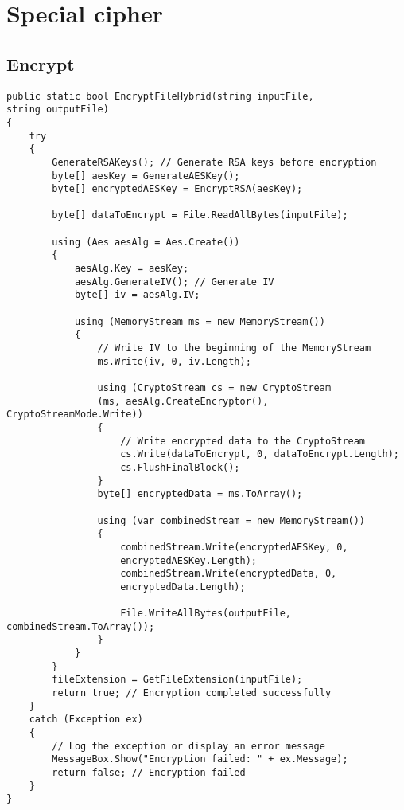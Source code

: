 \documentclass[a4paper,oneside,11pt]{book}
\begin{document}
\chapter[Special cipher]{Special cipher}
\section{Encrypt}
\begin{lstlisting}[language=Csh, caption={Endpoint to delete FITS file}]
public static bool EncryptFileHybrid(string inputFile, 
string outputFile)
{
    try
    {
        GenerateRSAKeys(); // Generate RSA keys before encryption
        byte[] aesKey = GenerateAESKey();
        byte[] encryptedAESKey = EncryptRSA(aesKey);
    
        byte[] dataToEncrypt = File.ReadAllBytes(inputFile);
    
        using (Aes aesAlg = Aes.Create())
        {
            aesAlg.Key = aesKey;
            aesAlg.GenerateIV(); // Generate IV
            byte[] iv = aesAlg.IV;
    
            using (MemoryStream ms = new MemoryStream())
            {
                // Write IV to the beginning of the MemoryStream
                ms.Write(iv, 0, iv.Length);
    
                using (CryptoStream cs = new CryptoStream
                (ms, aesAlg.CreateEncryptor(), CryptoStreamMode.Write))
                {
                    // Write encrypted data to the CryptoStream
                    cs.Write(dataToEncrypt, 0, dataToEncrypt.Length);
                    cs.FlushFinalBlock();
                }
                byte[] encryptedData = ms.ToArray();
    
                using (var combinedStream = new MemoryStream())
                {
                    combinedStream.Write(encryptedAESKey, 0, 
                    encryptedAESKey.Length);
                    combinedStream.Write(encryptedData, 0, 
                    encryptedData.Length);
    
                    File.WriteAllBytes(outputFile, combinedStream.ToArray());
                }
            }
        }
        fileExtension = GetFileExtension(inputFile);
        return true; // Encryption completed successfully
    }
    catch (Exception ex)
    {
        // Log the exception or display an error message
        MessageBox.Show("Encryption failed: " + ex.Message);
        return false; // Encryption failed
    }
}
\end{lstlisting}
\end{document}
